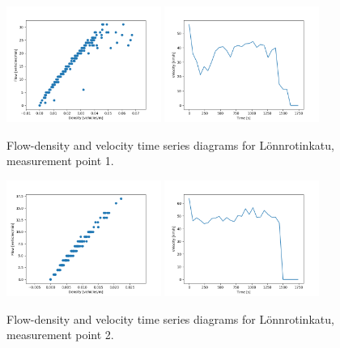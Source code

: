 \documentclass[english, 12pt, a4paper, elec, utf8, pdfa, online]{aaltothesis}
\begin{document}
\clearpage
\begin{figure}[ht!]
    \centering
    \includegraphics[width=0.45\textwidth]{graphs/Lonnrotinkatu_1_flw_dns.png}
    \includegraphics[width=0.45\textwidth]{graphs/Lonnrotinkatu_1_spd_time_6.png}
    \caption{Flow-density and velocity time series diagrams for Lönnrotinkatu, measurement point 1.}
\end{figure}
\begin{figure}[ht!]
    \centering
    \includegraphics[width=0.45\textwidth]{graphs/Lonnrotinkatu_2_flw_dns.png}
    \includegraphics[width=0.45\textwidth]{graphs/Lonnrotinkatu_2_spd_time_6.png}
    \caption{Flow-density and velocity time series diagrams for Lönnrotinkatu, measurement point 2.}
\end{figure}
\end{document}

